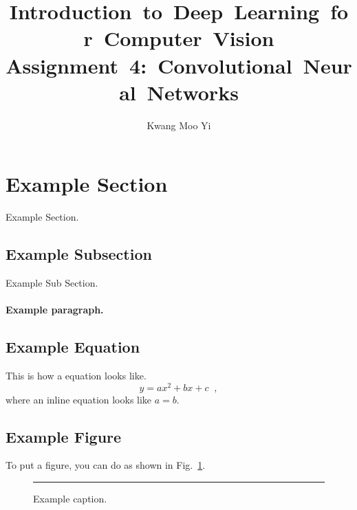 \documentclass[12pt, letter]{article}
\newcommand{\courseName}{Introduction~to~Deep~Learning~for~Computer~Vision}
\newcommand{\assignName}{Assignment~4:~Convolutional~Neural~Networks}
\begin{document}
\pagestyle{titlesec_assignment}

\title{\courseName\\\assignName}
\author{Kwang Moo Yi}
\maketitle


\section{Example Section}

Example Section. \lipsum[1]

\subsection{Example Subsection}

Example Sub Section. \lipsum[1]

\paragraph{Example paragraph.} \lipsum[1]


\subsection{Example  Equation}

This is how a equation looks like.
\begin{equation}
  y = a x^2 + b x + c
  \;\;, 
\end{equation}
where an inline equation looks like $a=b$.

\subsection{Example  Figure}

To put a figure, you can do as shown in Fig.~\ref{fig:eg}.
\begin{figure}
  \centering
  \rule{2cm}{2cm} %
  \caption{Example caption.}
  \label{fig:eg}
\end{figure}
\end{document}
